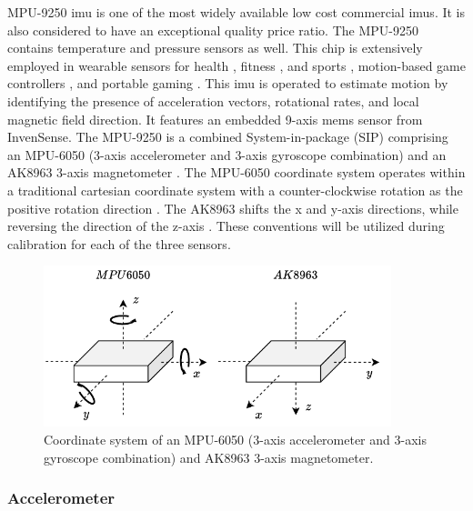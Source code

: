 MPU-9250 \acrshort{imu} is one of the most widely available low cost commercial \acrshort{imu}s. It is also considered to have an exceptional quality price ratio. The MPU-9250 contains temperature and pressure sensors as well. This chip is extensively employed in wearable sensors for health \cite{majumder2017wearable} \cite{al2019remote}, fitness \cite{altini2016cardiorespiratory}, and sports \cite{rum2021wearable} \cite{morris2008wearable} \cite{ermes2008detection}, motion-based game controllers \cite{heinz2006using}, and portable gaming \cite{mortazavi2013near} \cite{cao2019wearable}. This \acrshort{imu} is operated to estimate motion by identifying the presence of acceleration vectors, rotational rates, and local magnetic field direction. It features an embedded 9-axis \acrshort{mems} sensor from InvenSense. The MPU-9250 is a combined System-in-package (SIP) comprising an MPU-6050 (3-axis accelerometer and 3-axis gyroscope combination) and an AK8963 3-axis magnetometer \cite{mpu9250}. The MPU-6050 coordinate system operates within a traditional cartesian coordinate system with a counter-clockwise rotation as the positive rotation direction \cite{mpu6050}. The AK8963 shifts the x and y-axis directions, while reversing the direction of the z-axis \cite{ak8963c}. These conventions will be utilized during calibration for each of the three sensors.

\begin{figure}[!h]
    \centering
    \includegraphics[width=0.9\textwidth]{figures/mpu_orientation.pdf}
    \caption{ Coordinate system of an MPU-6050 (3-axis accelerometer and 3-axis gyroscope combination) and AK8963 3-axis magnetometer. \cite{mpu6050} \cite{ak8963c} }
    \label{fig:mpu_orientation}
\end{figure}

\subsubsection{Accelerometer}

